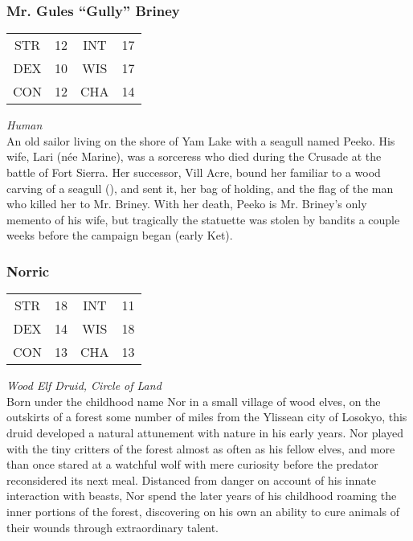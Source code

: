 \subsubsection{Mr. Gules ``Gully'' Briney}
\label{people:mrbriney}
\begin{center}
\begin{tabular}{c c|c c}
STR & 12 & INT & 17\\
DEX & 10 & WIS & 17 \\
CON & 12 & CHA & 14 \end{tabular}\end{center}
\textit{Human}\\
An old sailor living on the shore of Yam Lake with a seagull named Peeko. His wife, Lari (n\'ee Marine), was a sorceress who died during the Crusade at the battle of Fort Sierra. Her successor, Vill Acre, bound her familiar to a wood carving of a seagull (), and sent it, her bag of holding, and the flag of the man who killed her to Mr. Briney. With her death, Peeko is Mr. Briney's only memento of his wife, but tragically the statuette was stolen by bandits a couple weeks before the campaign began (early Ket). 


\subsubsection{Norric}
\label{people:jeff}
\begin{center}
\begin{tabular}{c c|c c}
STR & 18 & INT & 11\\
DEX & 14 & WIS & 18 \\
CON & 13 & CHA & 13 \end{tabular}\end{center}
\textit{Wood Elf Druid, Circle of Land}\\

Born under the childhood name Nor in a small village of wood elves, on the outskirts of a forest some number of miles from the Ylissean city of Losokyo, this druid developed a natural attunement with nature in his early years. Nor played with the tiny critters of the forest almost as often as his fellow elves, and more than once stared at a watchful wolf with mere curiosity before the predator reconsidered its next meal. Distanced from danger on account of his innate interaction with beasts, Nor spend the later years of his childhood roaming the inner portions of the forest, discovering on his own an ability to cure animals of their wounds through extraordinary talent. 


